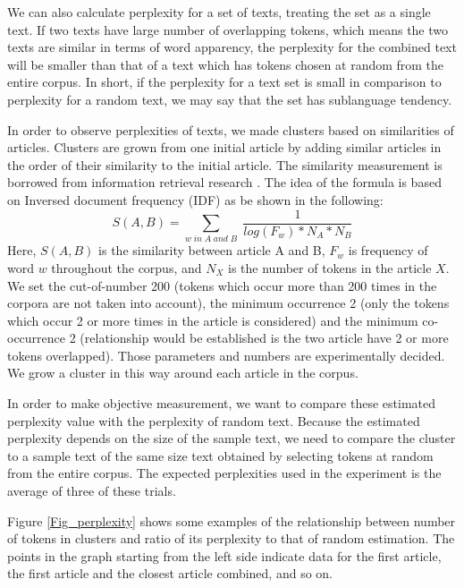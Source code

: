 We can also calculate perplexity for a set of texts,
treating the set as a single text.
If two texts have large number of overlapping tokens, 
which means the two texts are similar in terms of word apparency,
the perplexity for the combined text will be smaller than
that of a text which has tokens chosen at random from the entire corpus.
In short, if the perplexity for a text set is small 
in comparison to perplexity for a random text,
we may say that the set has sublanguage tendency.

In order to observe perplexities of texts,
we made clusters based on similarities of articles.
Clusters are grown from one initial article by adding similar articles
in the order of their similarity to the initial article.
The similarity measurement is borrowed from information retrieval research
\cite{Frankes:92}.
The idea of the formula is based on Inversed document frequency (IDF)
as be shown in the following:
\begin{equation}
  S(A,B) = \sum_{w \; in \; A \;and \;B} \; \frac{1}{log(F_{w}) * N_{A} * N_{B}}
\end{equation}
Here, $S(A,B)$ is the similarity between article A and B,
$F_{w}$ is frequency of word $w$ throughout the corpus, and
$N_{X}$ is the number of tokens in the article $X$.
We set the cut-of-number 200
(tokens which occur more than 200 times in the corpora are not taken into account),
the minimum occurrence 2 (only the tokens which occur 2 or more times
in the article is considered) and the minimum co-occurrence 2
(relationship would be established is the two article have 2 or more
tokens overlapped).
Those parameters and numbers are experimentally decided.
We grow a cluster in this way around each article in the corpus.

In order to make objective measurement,
we want to compare these estimated perplexity value with the
perplexity of random text.
Because the estimated perplexity depends on the size of the sample text, 
we need to compare the cluster to a sample text of the same size text
obtained by selecting tokens at random from the entire corpus.
The expected perplexities used in the experiment is the average of
three of these trials.

Figure \ref{Fig_perplexity} shows some examples of the relationship
between number of tokens in clusters and ratio of its perplexity to
that of random estimation.
The points in the graph starting  from the left side indicate data for the first article,
the first article and the closest article combined, and so on.

